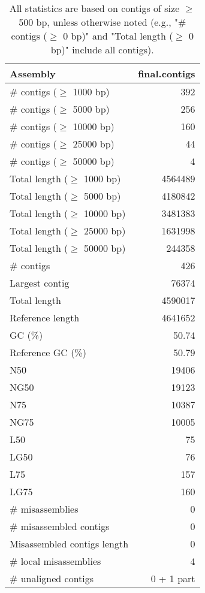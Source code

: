\documentclass[12pt,a4paper]{article}
\begin{document}
\begin{table}[ht]
\begin{center}
\caption{All statistics are based on contigs of size $\geq$ 500 bp, unless otherwise noted (e.g., "\# contigs ($\geq$ 0 bp)" and "Total length ($\geq$ 0 bp)" include all contigs).}
\begin{tabular}{|l*{1}{|r}|}
\hline
Assembly & final.contigs \\ \hline
\# contigs ($\geq$ 1000 bp) & 392 \\ \hline
\# contigs ($\geq$ 5000 bp) & 256 \\ \hline
\# contigs ($\geq$ 10000 bp) & 160 \\ \hline
\# contigs ($\geq$ 25000 bp) & 44 \\ \hline
\# contigs ($\geq$ 50000 bp) & 4 \\ \hline
Total length ($\geq$ 1000 bp) & 4564489 \\ \hline
Total length ($\geq$ 5000 bp) & 4180842 \\ \hline
Total length ($\geq$ 10000 bp) & 3481383 \\ \hline
Total length ($\geq$ 25000 bp) & 1631998 \\ \hline
Total length ($\geq$ 50000 bp) & 244358 \\ \hline
\# contigs & 426 \\ \hline
Largest contig & 76374 \\ \hline
Total length & 4590017 \\ \hline
Reference length & 4641652 \\ \hline
GC (\%) & 50.74 \\ \hline
Reference GC (\%) & 50.79 \\ \hline
N50 & 19406 \\ \hline
NG50 & 19123 \\ \hline
N75 & 10387 \\ \hline
NG75 & 10005 \\ \hline
L50 & 75 \\ \hline
LG50 & 76 \\ \hline
L75 & 157 \\ \hline
LG75 & 160 \\ \hline
\# misassemblies & 0 \\ \hline
\# misassembled contigs & 0 \\ \hline
Misassembled contigs length & 0 \\ \hline
\# local misassemblies & 4 \\ \hline
\# unaligned contigs & 0 + 1 part \\ \hline

\end{tabular}
\end{center}
\end{table}
\end{document}
